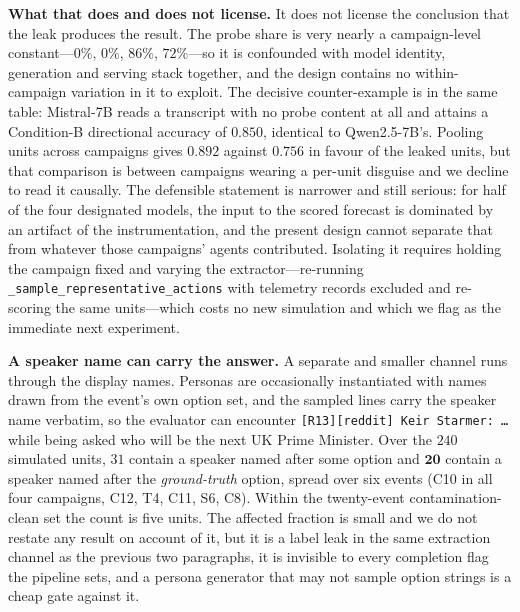 \documentclass[11pt,journal,onecolumn]{IEEEtran}
\begin{document}
\textbf{What that does and does not license.} It does not license the conclusion that the leak produces the result. The probe share is very nearly a campaign-level constant---$0\%$, $0\%$, $86\%$, $72\%$---so it is confounded with model identity, generation and serving stack together, and the design contains no within-campaign variation in it to exploit. The decisive counter-example is in the same table: Mistral-7B reads a transcript with no probe content at all and attains a Condition-B directional accuracy of $0.850$, identical to Qwen2.5-7B's. Pooling units across campaigns gives $0.892$ against $0.756$ in favour of the leaked units, but that comparison is between campaigns wearing a per-unit disguise and we decline to read it causally. The defensible statement is narrower and still serious: for half of the four designated models, the input to the scored forecast is dominated by an artifact of the instrumentation, and the present design cannot separate that from whatever those campaigns' agents contributed. Isolating it requires holding the campaign fixed and varying the extractor---re-running \texttt{\_sample\_representative\_actions} with telemetry records excluded and re-scoring the same units---which costs no new simulation and which we flag as the immediate next experiment.

\textbf{A speaker name can carry the answer.} A separate and smaller channel runs through the display names. Personas are occasionally instantiated with names drawn from the event's own option set, and the sampled lines carry the speaker name verbatim, so the evaluator can encounter \texttt{[R13][reddit] Keir Starmer: \ldots} while being asked who will be the next UK Prime Minister. Over the $240$ simulated units, $31$ contain a speaker named after some option and $\mathbf{20}$ contain a speaker named after the \emph{ground-truth} option, spread over six events (C10 in all four campaigns, C12, T4, C11, S6, C8). Within the twenty-event contamination-clean set the count is five units. The affected fraction is small and we do not restate any result on account of it, but it is a label leak in the same extraction channel as the previous two paragraphs, it is invisible to every completion flag the pipeline sets, and a persona generator that may not sample option strings is a cheap gate against it.
\end{document}
